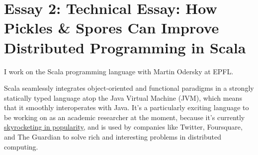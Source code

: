 \documentclass[acmtocl]{acmtrans2m}
\begin{document}









\section*{\textbf{Essay 2:} Technical Essay: How Pickles \& Spores Can Improve Distributed Programming in Scala}




I work on the Scala programming language with Martin Odersky at EPFL.


Scala seamlessly integrates object-oriented and functional paradigms in a
strongly statically typed language atop the Java Virtual Machine (JVM), which
means that it smoothly interoperates with Java. It's a particularly exciting
language to be working on as an academic researcher at the moment, because it's currently
\href{http://www.indeed.com/jobtrends/scala,+groovy+and+java,+erlang,+haskell.html}{skyrocketing in popularity},
and is used by companies like Twitter, Foursquare, and The Guardian to solve
rich and interesting problems in distributed computing.
\end{document}
